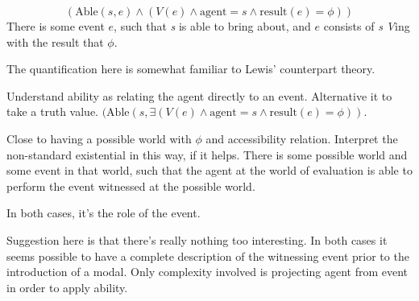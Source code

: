 \begin{note}
  \[(\text{Able}(s,e) \land (V(e) \land \text{agent} = s \land \text{result}(e) = \phi))\]
  There is some event \(e\), such that \emph{s} is able to bring about, and \(e\) consists of \emph{s} \emph{V}ing with the result that \(\phi\).

  The quantification here is somewhat familiar to Lewis' counterpart theory.

  Understand ability as relating the agent directly to an event.
  Alternative it to take a truth value.
  \((\text{Able}(s,\exists (V(e) \land \text{agent} = s \land \text{result}(e) = \phi))\).

  Close to having a possible world with \(\phi\) and accessibility relation.
  Interpret the non-standard existential in this way, if it helps.
  There is some possible world and some event in that world, such that the agent at the world of evaluation is able to perform the event witnessed at the possible world.

  In both cases, it's the role of the event.

  \begin{figure}[h]
    \begin{subfigure}{.5\textwidth}
      \centering
    \end{subfigure}
    \begin{subfigure}{.5\textwidth}
      \centering
    \end{subfigure}
  \end{figure}
  Suggestion here is that there's really nothing too interesting.
  In both cases it seems possible to have a complete description of the witnessing event prior to the introduction of a modal.
  Only complexity involved is projecting agent from event in order to apply ability.
\end{note}

